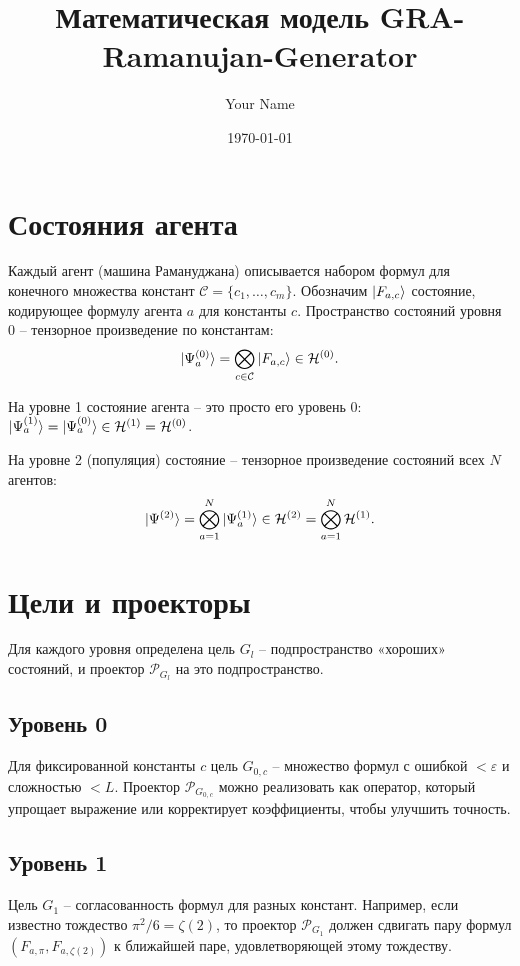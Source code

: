 \documentclass{article}
\title{Математическая модель GRA-Ramanujan-Generator}
\author{Your Name}
\date{\today}
\begin{document}
\maketitle

\section{Состояния агента}

Каждый агент (машина Рамануджана) описывается набором формул для конечного множества констант $\mathcal{C} = \{c_1,\dots,c_m\}$. Обозначим $\ket{F_{a,c}}$ состояние, кодирующее формулу агента $a$ для константы $c$. Пространство состояний уровня 0 – тензорное произведение по константам:
\[
\ket{\Psi_a^{(0)}} = \bigotimes_{c\in\mathcal{C}} \ket{F_{a,c}} \in \mathcal{H}^{(0)}.
\]

На уровне 1 состояние агента – это просто его уровень 0: $\ket{\Psi_a^{(1)}} = \ket{\Psi_a^{(0)}} \in \mathcal{H}^{(1)} = \mathcal{H}^{(0)}$.

На уровне 2 (популяция) состояние – тензорное произведение состояний всех $N$ агентов:
\[
\ket{\Psi^{(2)}} = \bigotimes_{a=1}^N \ket{\Psi_a^{(1)}} \in \mathcal{H}^{(2)} = \bigotimes_{a=1}^N \mathcal{H}^{(1)}.
\]

\section{Цели и проекторы}

Для каждого уровня определена цель $G_l$ – подпространство «хороших» состояний, и проектор $\mathcal{P}_{G_l}$ на это подпространство.

\subsection{Уровень 0}
Для фиксированной константы $c$ цель $G_{0,c}$ – множество формул с ошибкой $<\varepsilon$ и сложностью $<L$. Проектор $\mathcal{P}_{G_{0,c}}$ можно реализовать как оператор, который упрощает выражение или корректирует коэффициенты, чтобы улучшить точность.

\subsection{Уровень 1}
Цель $G_1$ – согласованность формул для разных констант. Например, если известно тождество $\pi^2/6 = \zeta(2)$, то проектор $\mathcal{P}_{G_1}$ должен сдвигать пару формул $(F_{a,\pi}, F_{a,\zeta(2)})$ к ближайшей паре, удовлетворяющей этому тождеству.
\end{document}
